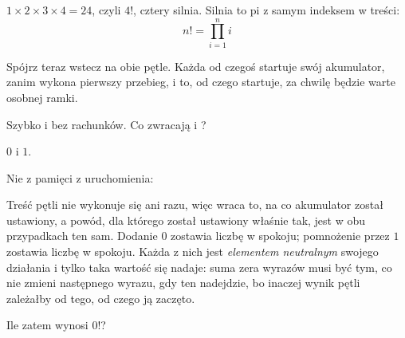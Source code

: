 \begin{fr}
\begin{ansblock}
$1 \times 2 \times 3 \times 4 = 24$, czyli $4!$, cztery silnia. Silnia to pi z
samym indeksem w treści:
\[ n! = \prod_{i=1}^{n} i \]
\end{ansblock}

Spójrz teraz wstecz na obie pętle. Każda od czegoś startuje swój akumulator,
zanim wykona pierwszy przebieg, i to, od czego startuje, za chwilę będzie warte
osobnej ramki.

Szybko i bez rachunków. Co zwracają  i ?
\dotline
\nextframe
\end{fr}

\begin{fr}
\begin{ansblock}
$0$ i $1$.
\end{ansblock}

Nie z pamięci \dash{} z uruchomienia:


Treść pętli nie wykonuje się ani razu, więc wraca to, na co akumulator został
ustawiony, a powód, dla którego został ustawiony właśnie tak, jest w obu
przypadkach ten sam. Dodanie $0$ zostawia liczbę w spokoju; pomnożenie przez
$1$ zostawia liczbę w spokoju. Każda z nich jest \emph{elementem neutralnym}
swojego działania i tylko taka wartość się nadaje: suma zera wyrazów musi być
tym, co nie zmieni następnego wyrazu, gdy ten nadejdzie, bo inaczej wynik
pętli zależałby od tego, od czego ją zaczęto.

Ile zatem wynosi $0!$?
\nextframe
\end{fr}

